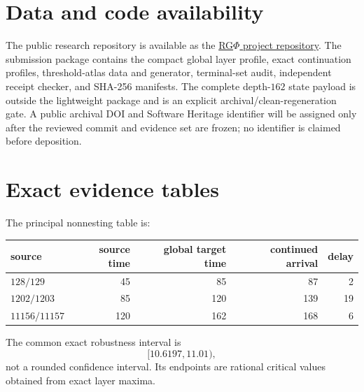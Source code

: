 \documentclass[11pt]{amsart}
\theoremstyle{definition}
\begin{document}
\section{Data and code availability}

The public research repository is available as the \href{https://github.com/FacundoFirmenich/rgphi-radix-mobius-dynamics}{RG$\Phi$ project repository}.  The submission package contains the compact global layer profile, exact continuation profiles, threshold-atlas data and generator, terminal-set audit, independent receipt checker, and SHA-256 manifests.  The complete depth-$162$ state payload is outside the lightweight package and is an explicit archival/clean-regeneration gate.  A public archival DOI and Software Heritage identifier will be assigned only after the reviewed commit and evidence set are frozen; no identifier is claimed before deposition.

\appendix
\section{Exact evidence tables}

The principal nonnesting table is:
\begin{center}
\begin{tabular}{lrrrr}
\toprule
source&source time&global target time&continued arrival&delay\\
\midrule
$128/129$&45&85&87&2\\
$1202/1203$&85&120&139&19\\
$11156/11157$&120&162&168&6\\
\bottomrule
\end{tabular}
\end{center}

The common exact robustness interval is
\[
[10.6197,11.01),
\]
not a rounded confidence interval.  Its endpoints are rational critical values obtained from exact layer maxima.
\end{document}
